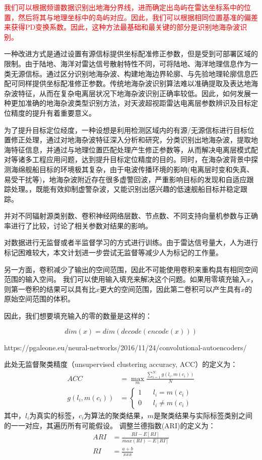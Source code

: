 \textcolor{red}{
我们可以根据频谱数据识别出地海分界线，进而确定出岛屿在雷达坐标系中的位置，然后将其与地理坐标中的岛屿对应。因此，我们可以根据相同位置基准的偏差来获得PD变换系数。因此，这种方法最基础和最关键的部分是识别地海杂波识别。
}

一种改进方式是通过设置有源信标提供坐标配准修正参数，但是受到可部署区域的限制。由于陆地、海洋对雷达信号散射特性不同，可将陆地、海洋地理信息作为一类无源信标。通过区分识别地海杂波、构建地海边界轮廓、与先验地理轮廓信息匹配可同样提供坐标配准修正参数。传统地海杂波识别算法难以准确提取及表达地海杂波特征，从而在复杂电离层状况下地海杂波识别正确率较低。因此，如何发展一种更加准确的地海杂波类型识别方法，对天波超视距雷达电离层参数辨识及目标定位精度的提升有着重要意义。

为了提升目标定位经度，一种设想是利用检测区域内的有源/无源信标进行目标位置修正处理，通过对地海杂波特征深入分析和研究，分类识别出地海杂波，提取地海特征信息，并通过与地理位置匹配处理产生修正参数等，从而解决电离层模式配对等诸多工程应用问题，达到提升目标定位精度的目的。同时，在海杂波背景中探测海绵舰船目标的环境极其复杂，由于电波传播环境的影响(电离层时变和失真、易受干扰等)，地海杂波附近存在很多虚警回波，严重影响目标的发现和自适应跟踪处理。，既能有效抑制虚警杂波，又能识别出感兴趣的低速舰船目标并稳定跟踪。

并对不同辐射源类别数、卷积神经网络层数、节点数、不同支持向量机参数与正确率进行了比较，讨论了相关参数对结果的影响。

对数据进行无监督或者半监督学习的方式进行训练。由于雷达信号量大，人为进行标记困难较大，本文计划进一步尝试无监督等减少人为标记的工作量。

另一方面，卷积减少了输出的空间范围，因此不可能使用卷积来重构具有相同空间范围的输入空间。
我们可以使用输入填充来解决这个问题。如果用零填充输入$x$，则第一卷积的结果可以具有比$x$更大的空间范围，因此第二卷积可以产生具有$x$的原始空间范围的体积。

因此，我们想要填充输入的零的数量是这样的：

\begin{equation}
	dim(x)=dim(decode(encode(x)))
\end{equation}

https://pgaleone.eu/neural-networks/2016/11/24/convolutional-autoencoders/

此处无监督聚类精度（unsupervised clustering accuracy, ACC）的定义为：
\begin{align}
	ACC &= \max\limits_m\frac{\sum_{i=1}^Ng(l_i,m(c_i))}{N} \\
	g(l_i,m(c_i)) &= \left\{
		\begin{array}{rcl}
		1       &      & l_i = m(c_i)\\
		0       &      & l_i \neq m(c_i)
		\end{array} \right. \nonumber
\end{align}
其中，$l_i$为真实的标签，$c_i$为算法的聚类结果，$m$是聚类结果与实际标签类别之间的一一对应，其遍历所有可能假设。
调整兰德指数(ARI)的定义为：
\begin{align}
	ARI &= \frac{RI - E[RI]}{max(RI)-E[RI]} \\
	RI &= \frac{a+b}{xxx}
\end{align}

